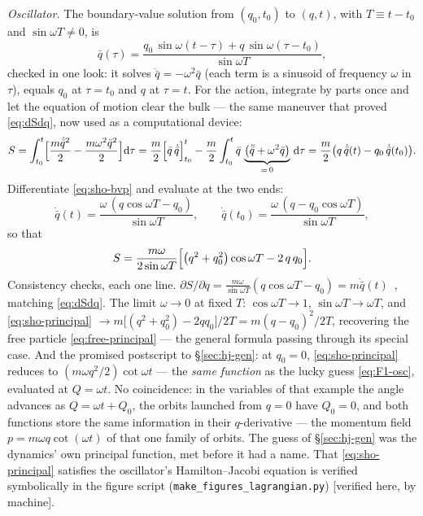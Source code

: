 \documentclass[11pt]{article}
\theoremstyle{plain}
\theoremstyle{definition}
\theoremstyle{remark}
\newcommand{\dd}{\mathrm{d}}
\begin{document}
\emph{Oscillator.} The boundary-value solution from $(q_0, t_0)$ to
$(q, t)$, with $T \equiv t - t_0$ and $\sin\omega T \ne 0$, is
\begin{equation}
  \bar q(\tau)
  = \frac{q_0\,\sin\omega(t - \tau) + q\,\sin\omega(\tau - t_0)}
         {\sin\omega T} ,
  \label{eq:sho-bvp}
\end{equation}
checked in one look: it solves $\ddot{\bar q} = -\omega^2\bar q$ (each
term is a sinusoid of frequency $\omega$ in $\tau$), equals $q_0$ at
$\tau = t_0$ and $q$ at $\tau = t$. For the action, integrate by parts
once and let the equation of motion clear the bulk --- the same
maneuver that proved \eqref{eq:dSdq}, now used as a computational
device:
\begin{equation}
  S = \int_{t_0}^{t}\Bigl[\frac{m\dot{\bar q}^2}{2}
      - \frac{m\omega^2\bar q^2}{2}\Bigr]\dd\tau
    = \frac{m}{2}\Bigl[\bar q\,\dot{\bar q}\Bigr]_{t_0}^{t}
    - \frac{m}{2}\int_{t_0}^{t}
      \bar q\,\underbrace{\bigl(\ddot{\bar q}
      + \omega^2 \bar q\bigr)}_{=\,0}\,\dd\tau
    = \frac{m}{2}\bigl(q\,\dot{\bar q}(t) - q_0\,\dot{\bar q}(t_0)\bigr).
\end{equation}
Differentiate \eqref{eq:sho-bvp} and evaluate at the two ends:
\begin{equation}
  \dot{\bar q}(t) = \frac{\omega\,(q\cos\omega T - q_0)}{\sin\omega T},
  \qquad
  \dot{\bar q}(t_0) = \frac{\omega\,(q - q_0\cos\omega T)}{\sin\omega T},
\end{equation}
so that
\begin{equation}
  S = \frac{m\omega}{2\sin\omega T}
  \Bigl[\bigl(q^2 + q_0^2\bigr)\cos\omega T - 2\,q\,q_0\Bigr] .
  \label{eq:sho-principal}
\end{equation}
Consistency checks, each one line. $\partial S/\partial q
= \frac{m\omega}{\sin\omega T}(q\cos\omega T - q_0)
= m\dot{\bar q}(t)$~\checkmark, matching \eqref{eq:dSdq}. The limit
$\omega \to 0$ at fixed $T$: $\cos\omega T \to 1$,
$\sin\omega T \to \omega T$, and \eqref{eq:sho-principal} $\to
m\bigl[(q^2 + q_0^2) - 2qq_0\bigr]/2T = m(q - q_0)^2/2T$, recovering
the free particle \eqref{eq:free-principal} --- the general formula
passing through its special case. And the promised postscript to
\S\ref{sec:hj-gen}: at $q_0 = 0$, \eqref{eq:sho-principal} reduces to
$(m\omega q^2/2)\cot\omega t$ --- the \emph{same function} as the
lucky guess \eqref{eq:F1-osc}, evaluated at $Q = \omega t$. No
coincidence: in the variables of that example the angle advances as
$Q = \omega t + Q_0$, the orbits launched from $q = 0$ have
$Q_0 = 0$, and both functions store the same information in their
$q$-derivative --- the momentum field $p = m\omega q\cot(\omega t)$
of that one family of orbits. The guess of \S\ref{sec:hj-gen} was the
dynamics' own principal function, met before it had a name. That
\eqref{eq:sho-principal} satisfies the oscillator's Hamilton--Jacobi
equation is verified symbolically in the figure script
(\texttt{make\_figures\_lagrangian.py}) [verified here, by machine].
\end{document}
